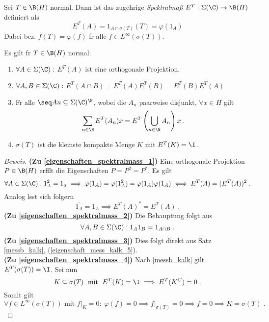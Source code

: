 \begin{definition}
	Sei \(T\in \B(H)\) normal. Dann ist das zugeh\os rige \textit{Spektralma\ss{}} \(E^T: \Sigma(\C) \to \B(H)\) definiert als
	\[E^T(A) = 1_{A\cap \sigma(T)}(T) = \varphi(1_A)\]
	Dabei bez. \(f(T) = \varphi(f)\) f\us r alle \( f \in L^\infty(\sigma(T))\).
\end{definition}

\begin{theorem}
	Es gilt f\us r \(T\in \B(H)\) normal:
	\end{theorem}
	\begin{enumerate}
		\item \(\forall A \in \Sigma(\C):\) \(E^T(A)\) ist eine orthogonale Projektion. \label{eigenschaften_spektralmass_1}
		\item \(\forall A, B \in \Sigma(\C):\) \(E^T(A\cap B) = E^T(A)E^T(B) = E^T(B)E^T(A)\)\label{eigenschaften_spektralmass_2}
		\item F\us r alle \(\seq An \subseteq \Sigma(\C)^\N\), wobei die $A_n$ paarweise disjunkt, \(\forall x \in H\) gilt \label{eigenschaften_spektralmass_3}
		\[\sum_{n\in\N}E^T(A_n)x = E^T\left(\bigcup_{n\in\N} A_n\right)x\;.\]
		\item \(\sigma(T)\) ist die kleinste kompakte Menge $K$ mit \(E^T(K)= \I\).\label{eigenschaften_spektralmass_4}
	\end{enumerate}
	\begin{proof}[Beweis]
		\textbf{(Zu \ref{eigenschaften_spektralmass_1})} Eine orthogonale Projektion $P\in\B(H)$ erf\us llt die Eigenschaften $P= P^2 = P^*$. Es gilt 
		\[\forall A \in \Sigma(\C): 1_A^2 = 1_a \implies \varphi(1_A) = \varphi(1_A^2) = \varphi(1_A) \varphi(1_A)  \iff E^T(A) = (E^T(A))^2\;.\]
		Analog l\as sst sich folgern
		\[\overline{1_A} = 1_A \implies E^T(A)^* = E^T(A)\;.\]
		\textbf{(Zu \ref{eigenschaften_spektralmass_2})} Die Behauptung folgt aus 
		\[\forall A, B \in \Sigma(\C): 1_A1_B = 1_{A\cap B}\;.\]
		\textbf{(Zu \ref{eigenschaften_spektralmass_3})} Dies folgt direkt aus Satz \ref{messb_kalk}, (\ref{eigenschaft_mess_kalk_5}).\\
		\textbf{(Zu \ref{eigenschaften_spektralmass_4})} Nach \ref{messb_kalk} gilt \(E^T(\sigma(T)) = \I\). Sei nun 
		\[K \subseteq \sigma(T) \;\text{ mit } \; E^T(K) = \I \implies E^T(K^C) = 0\;.\]
		Somit gilt 
		\[\forall f \in L^\infty(\sigma(T)) \text{ mit } f\vert_K = 0:\; \varphi(f) = 0 \implies f\vert_{\sigma(T)} = 0 \implies f=0 \implies K = \sigma(T)\;.\]
	\end{proof}
	
